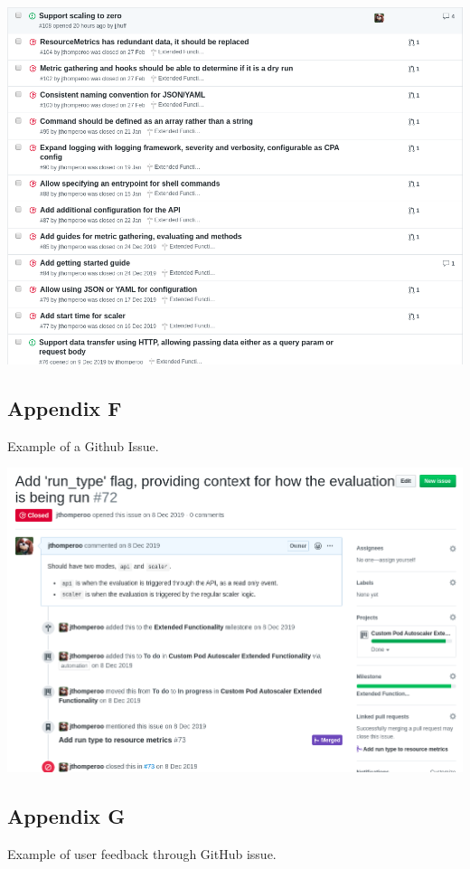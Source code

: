 \includegraphics[width=1.0\textwidth]{assets/implementation/gh_issues.png}
\newpage

\subsection{Appendix F}

Example of a Github Issue.

\includegraphics[width=1.0\textwidth]{assets/implementation/gh_issue_example.png}
\newpage

\subsection{Appendix G}

Example of user feedback through GitHub issue.

